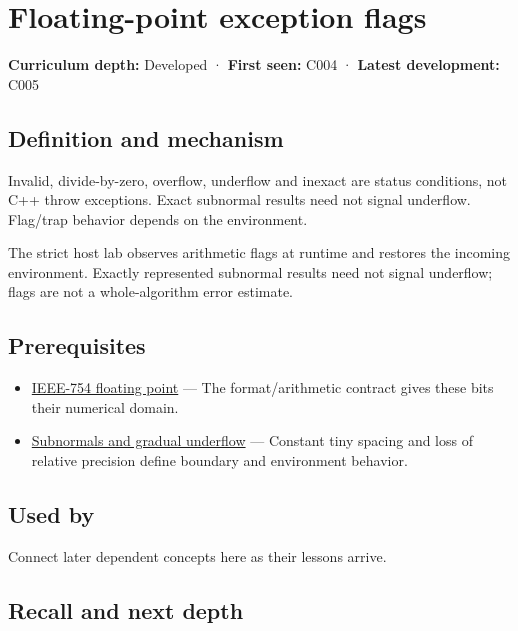 \hypertarget{appendix-ed8531b46754}{}\label{referencestart:appendix-ed8531b46754}
\section{Floating-point exception flags}\label{appendix-ed8531b46754-floating-point-exception-flags}

\textbf{Curriculum depth:} Developed · \textbf{First seen:} C004 · \textbf{Latest development:} C005

\subsection{Definition and mechanism}\label{appendix-ed8531b46754-definition-and-mechanism}

Invalid, divide-by-zero, overflow, underflow and inexact are status conditions, not C++ throw exceptions. Exact subnormal results need not signal underflow. Flag/trap behavior depends on the environment.

The strict host lab observes arithmetic flags at runtime and restores the incoming environment. Exactly represented subnormal results need not signal underflow; flags are not a whole-algorithm error estimate.

\subsection{Prerequisites}\label{appendix-ed8531b46754-prerequisites}

\begin{itemize}
\tightlist
\item
  \hyperref[appendix-343615f49ddf]{IEEE-754 floating point} --- The format/arithmetic contract gives these bits their numerical domain.
\item
  \hyperref[appendix-00a6e044c437]{Subnormals and gradual underflow} --- Constant tiny spacing and loss of relative precision define boundary and environment behavior.
\end{itemize}

\subsection{Used by}\label{appendix-ed8531b46754-used-by}

Connect later dependent concepts here as their lessons arrive.

\subsection{Recall and next depth}\label{appendix-ed8531b46754-recall-and-next-depth}

